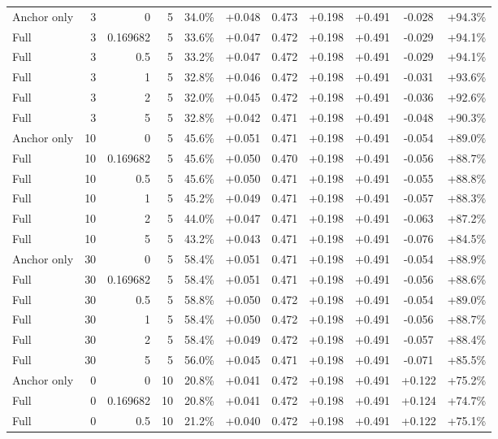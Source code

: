 \begin{table}[htbp]
\begin{tabular}{lrrrccccccc}
Anchor only & 3 & 0 & 5 & 34.0\% & +0.048 & 0.473 & +0.198 & +0.491 & -0.028 & +94.3\% \\
Full & 3 & 0.169682 & 5 & 33.6\% & +0.047 & 0.472 & +0.198 & +0.491 & -0.029 & +94.1\% \\
Full & 3 & 0.5 & 5 & 33.2\% & +0.047 & 0.472 & +0.198 & +0.491 & -0.029 & +94.1\% \\
Full & 3 & 1 & 5 & 32.8\% & +0.046 & 0.472 & +0.198 & +0.491 & -0.031 & +93.6\% \\
Full & 3 & 2 & 5 & 32.0\% & +0.045 & 0.472 & +0.198 & +0.491 & -0.036 & +92.6\% \\
Full & 3 & 5 & 5 & 32.8\% & +0.042 & 0.471 & +0.198 & +0.491 & -0.048 & +90.3\% \\
Anchor only & 10 & 0 & 5 & 45.6\% & +0.051 & 0.471 & +0.198 & +0.491 & -0.054 & +89.0\% \\
Full & 10 & 0.169682 & 5 & 45.6\% & +0.050 & 0.470 & +0.198 & +0.491 & -0.056 & +88.7\% \\
Full & 10 & 0.5 & 5 & 45.6\% & +0.050 & 0.471 & +0.198 & +0.491 & -0.055 & +88.8\% \\
Full & 10 & 1 & 5 & 45.2\% & +0.049 & 0.471 & +0.198 & +0.491 & -0.057 & +88.3\% \\
Full & 10 & 2 & 5 & 44.0\% & +0.047 & 0.471 & +0.198 & +0.491 & -0.063 & +87.2\% \\
Full & 10 & 5 & 5 & 43.2\% & +0.043 & 0.471 & +0.198 & +0.491 & -0.076 & +84.5\% \\
Anchor only & 30 & 0 & 5 & 58.4\% & +0.051 & 0.471 & +0.198 & +0.491 & -0.054 & +88.9\% \\
Full & 30 & 0.169682 & 5 & 58.4\% & +0.051 & 0.471 & +0.198 & +0.491 & -0.056 & +88.6\% \\
Full & 30 & 0.5 & 5 & 58.8\% & +0.050 & 0.472 & +0.198 & +0.491 & -0.054 & +89.0\% \\
Full & 30 & 1 & 5 & 58.4\% & +0.050 & 0.472 & +0.198 & +0.491 & -0.056 & +88.7\% \\
Full & 30 & 2 & 5 & 58.4\% & +0.049 & 0.472 & +0.198 & +0.491 & -0.057 & +88.4\% \\
Full & 30 & 5 & 5 & 56.0\% & +0.045 & 0.471 & +0.198 & +0.491 & -0.071 & +85.5\% \\
Anchor only & 0 & 0 & 10 & 20.8\% & +0.041 & 0.472 & +0.198 & +0.491 & +0.122 & +75.2\% \\
Full & 0 & 0.169682 & 10 & 20.8\% & +0.041 & 0.472 & +0.198 & +0.491 & +0.124 & +74.7\% \\
Full & 0 & 0.5 & 10 & 21.2\% & +0.040 & 0.472 & +0.198 & +0.491 & +0.122 & +75.1\% \\

\end{tabular}
\end{table}
